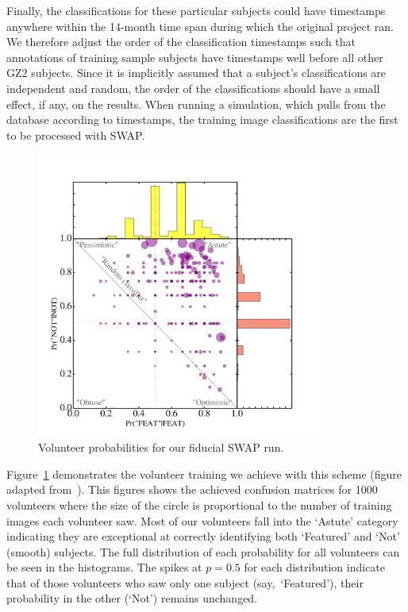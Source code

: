 \documentclass[twocolumn]{aastex6}
\newcommand{\feat}{`Featured'}
\newcommand{\notfeat}{`Not'}
\begin{document}
Finally, the classifications for these particular subjects could 
have timestamps anywhere within the 14-month time span during which the original project ran.
We therefore adjust the order of the classification timestamps such that 
annotations of training sample subjects
have timestamps well before all other GZ2 subjects. Since it is implicitly assumed
that a subject's classifications are independent and random, the order of the 
classifications should have a small effect, if any, on the results.  
When running a simulation, which pulls from the database according to timestamps,
the training image classifications are the first to be processed with SWAP.  


\begin{figure}[t!]
\includegraphics[width=3.7in]{figures/test_user_probs.png}
\caption{Volunteer probabilities for our fiducial SWAP run.  \label{fig: volunteer training}}
\end{figure}

Figure~\ref{fig: volunteer training} demonstrates the volunteer training we achieve
with this scheme (figure adapted from~\cite{Marshall2016}). 
This figures shows the achieved confusion matrices for 1000 volunteers
where the size of the circle is proportional to the number of training images each
volunteer saw. Most of our volunteers fall into the `Astute' category indicating
they are exceptional at correctly identifying both `Featured' and `Not' (smooth) subjects. 
The full distribution of each probability for all volunteers can be seen in the 
histograms. The spikes at $p=0.5$ for each distribution indicate that of those
volunteers who saw only one subject (say,~\feat), their probability in the 
other (\notfeat) remains unchanged.
\end{document}
